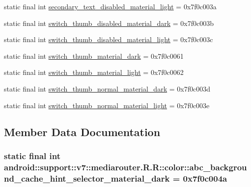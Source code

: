 \begin{CompactItemize}
\item 
static final int \hyperlink{classandroid_1_1support_1_1v7_1_1mediarouter_1_1_r_1_1color_f9316110c7552188db21dfe49bb0a7ec}{secondary\_\-text\_\-disabled\_\-material\_\-light} = 0x7f0c003a
\item 
static final int \hyperlink{classandroid_1_1support_1_1v7_1_1mediarouter_1_1_r_1_1color_8ad8c2ce7f683e971df46df5ebc6d93b}{switch\_\-thumb\_\-disabled\_\-material\_\-dark} = 0x7f0c003b
\item 
static final int \hyperlink{classandroid_1_1support_1_1v7_1_1mediarouter_1_1_r_1_1color_9f981034a648c39a9955c66ea0c292d7}{switch\_\-thumb\_\-disabled\_\-material\_\-light} = 0x7f0c003c
\item 
static final int \hyperlink{classandroid_1_1support_1_1v7_1_1mediarouter_1_1_r_1_1color_73cb1acc72a9366b8b3d6ce36f12f652}{switch\_\-thumb\_\-material\_\-dark} = 0x7f0c0061
\item 
static final int \hyperlink{classandroid_1_1support_1_1v7_1_1mediarouter_1_1_r_1_1color_08de977792c51a9ac6516e9b0a56c8f3}{switch\_\-thumb\_\-material\_\-light} = 0x7f0c0062
\item 
static final int \hyperlink{classandroid_1_1support_1_1v7_1_1mediarouter_1_1_r_1_1color_041c358e52917685666e1b544872ba31}{switch\_\-thumb\_\-normal\_\-material\_\-dark} = 0x7f0c003d
\item 
static final int \hyperlink{classandroid_1_1support_1_1v7_1_1mediarouter_1_1_r_1_1color_3e2e0e086fd4bffe57a145b5de3102a2}{switch\_\-thumb\_\-normal\_\-material\_\-light} = 0x7f0c003e
\end{CompactItemize}


\subsection{Member Data Documentation}
\hypertarget{classandroid_1_1support_1_1v7_1_1mediarouter_1_1_r_1_1color_349a8505bd96c05b2759d2cdd5846b76}{
\subsubsection[{abc\_\-background\_\-cache\_\-hint\_\-selector\_\-material\_\-dark}]{\setlength{\rightskip}{0pt plus 5cm}static final int android::support::v7::mediarouter.R.R::color::abc\_\-background\_\-cache\_\-hint\_\-selector\_\-material\_\-dark = 0x7f0c004a}}
\label{classandroid_1_1support_1_1v7_1_1mediarouter_1_1_r_1_1color_349a8505bd96c05b2759d2cdd5846b76}


